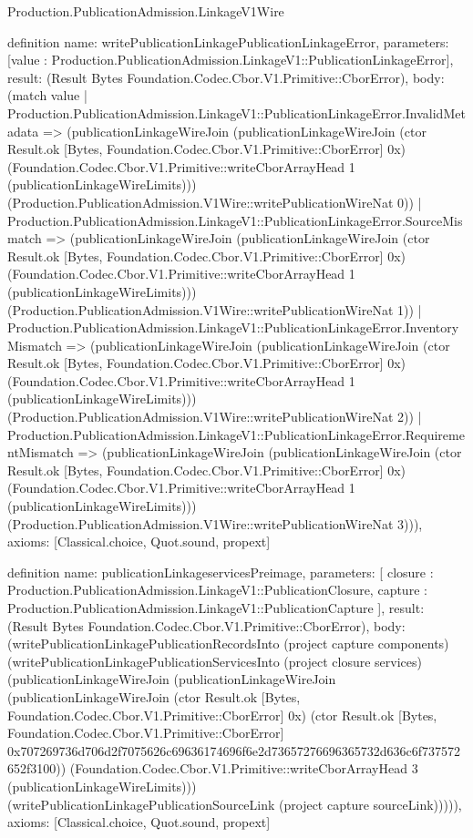 \begin{lexlean}{Production.PublicationAdmission.LinkageV1Wire}
\begin{semanticmodule}
definition{
  name: writePublicationLinkagePublicationLinkageError,
  parameters: [value : Production.PublicationAdmission.LinkageV1::PublicationLinkageError],
  result: (Result Bytes Foundation.Codec.Cbor.V1.Primitive::CborError),
  body: (match value
    | Production.PublicationAdmission.LinkageV1::PublicationLinkageError.InvalidMetadata => (publicationLinkageWireJoin (publicationLinkageWireJoin (ctor Result.ok [Bytes, Foundation.Codec.Cbor.V1.Primitive::CborError] 0x) (Foundation.Codec.Cbor.V1.Primitive::writeCborArrayHead 1 (publicationLinkageWireLimits))) (Production.PublicationAdmission.V1Wire::writePublicationWireNat 0))
    | Production.PublicationAdmission.LinkageV1::PublicationLinkageError.SourceMismatch => (publicationLinkageWireJoin (publicationLinkageWireJoin (ctor Result.ok [Bytes, Foundation.Codec.Cbor.V1.Primitive::CborError] 0x) (Foundation.Codec.Cbor.V1.Primitive::writeCborArrayHead 1 (publicationLinkageWireLimits))) (Production.PublicationAdmission.V1Wire::writePublicationWireNat 1))
    | Production.PublicationAdmission.LinkageV1::PublicationLinkageError.InventoryMismatch => (publicationLinkageWireJoin (publicationLinkageWireJoin (ctor Result.ok [Bytes, Foundation.Codec.Cbor.V1.Primitive::CborError] 0x) (Foundation.Codec.Cbor.V1.Primitive::writeCborArrayHead 1 (publicationLinkageWireLimits))) (Production.PublicationAdmission.V1Wire::writePublicationWireNat 2))
    | Production.PublicationAdmission.LinkageV1::PublicationLinkageError.RequirementMismatch => (publicationLinkageWireJoin (publicationLinkageWireJoin (ctor Result.ok [Bytes, Foundation.Codec.Cbor.V1.Primitive::CborError] 0x) (Foundation.Codec.Cbor.V1.Primitive::writeCborArrayHead 1 (publicationLinkageWireLimits))) (Production.PublicationAdmission.V1Wire::writePublicationWireNat 3))),
  axioms: [Classical.choice, Quot.sound, propext]
}

definition{
  name: publicationLinkageservicesPreimage,
  parameters: [
    closure : Production.PublicationAdmission.LinkageV1::PublicationClosure,
    capture : Production.PublicationAdmission.LinkageV1::PublicationCapture
  ],
  result: (Result Bytes Foundation.Codec.Cbor.V1.Primitive::CborError),
  body: (writePublicationLinkagePublicationRecordsInto (project capture components) (writePublicationLinkagePublicationServicesInto (project closure services) (publicationLinkageWireJoin (publicationLinkageWireJoin (publicationLinkageWireJoin (ctor Result.ok [Bytes, Foundation.Codec.Cbor.V1.Primitive::CborError] 0x) (ctor Result.ok [Bytes, Foundation.Codec.Cbor.V1.Primitive::CborError] 0x707269736d706d2f7075626c69636174696f6e2d73657276696365732d636c6f737572652f3100)) (Foundation.Codec.Cbor.V1.Primitive::writeCborArrayHead 3 (publicationLinkageWireLimits))) (writePublicationLinkagePublicationSourceLink (project capture sourceLink))))),
  axioms: [Classical.choice, Quot.sound, propext]
}


\end{semanticmodule}
\end{lexlean}
